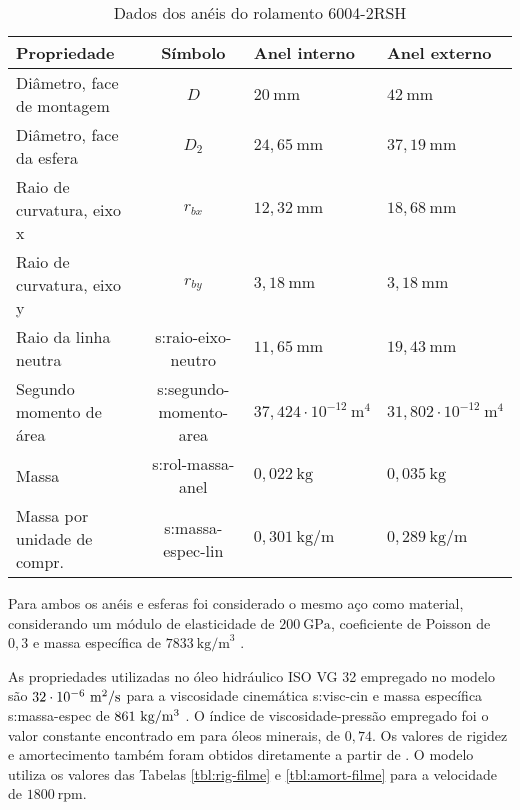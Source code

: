\documentclass[12pt,oneside,english,brazil,lmodern,siglas,simbolos,cite=num]{ucsmonograph}
\begin{document}
	\begin{table}[b]
	\def\arraystretch{1.2}
	\caption{Dados dos anéis do rolamento 6004-2RSH}
	\begin{tabular}{l|c|l|l}
	\toprule
	\textbf{Propriedade} & \textbf{Símbolo} & \textbf{Anel interno} & \textbf{Anel externo} \\\midrule
	Diâmetro, face de montagem & $D$ & $20\ \text{mm}$ & $ 42\ \text{mm}$ \\
	Diâmetro, face da esfera & $D_2$ & $24,65\ \text{mm}$ & $37,19\ \text{mm}$ \\
	Raio de curvatura, eixo x & $r_{bx}$ & $12,32\ \text{mm}$ & $18,68\ \text{mm}$ \\
	Raio de curvatura, eixo y & $r_{by}$ & $3,18\ \text{mm}$ & $3,18\ \text{mm}$ \\
	Raio da linha neutra & \gls{s:raio-eixo-neutro} & $11,65\ \text{mm}$ & $19,43\ \text{mm}$ \\
	Segundo momento de área & \gls{s:segundo-momento-area} & $37,424\cdot 10^{-12}\ \text{m}^4$ & $31,802\cdot 10^{-12}\ \text{m}^4$ \\
	Massa & \gls{s:rol-massa-anel} & $0,022\ \text{kg}$ & $0,035\ \text{kg}$ \\
	Massa por unidade de compr. & \gls{s:massa-espec-lin} & $0,301\ \text{kg/m}$ & $0,289\ \text{kg/m}$ \\\bottomrule
	\end{tabular}
	\label{tbl:6004-aneis}
	\end{table}
	
	Para ambos os anéis e esferas foi considerado o mesmo aço como material, considerando um módulo de elasticidade de $200\ \text{GPa}$, coeficiente de Poisson de $ 0,3 $ e massa específica de $ 7833\ \text{kg/m}^3$ \cite{hamrock:1991}.
	
	As propriedades utilizadas no óleo hidráulico ISO VG 32 empregado no modelo são $32\cdot 10^{-6}\ \text{m\textsuperscript{2}/s}$ para a viscosidade cinemática \gls{s:visc-cin} e massa específica \gls{s:massa-espec} de $861\ \text{kg/m\textsuperscript{3}}$ \cite{iso-vg32}.
	O índice de viscosidade-pressão empregado foi o valor constante encontrado em \cite{roelands:1966} para óleos minerais, de $0,74$.
	Os valores de rigidez e amortecimento também foram obtidos diretamente a partir de \cite{nonato:2014}.
	O modelo utiliza os valores das Tabelas \ref{tbl:rig-filme} e \ref{tbl:amort-filme} para a velocidade de $1800\ \text{rpm}$.

	\begin{figure}[t]
		\label{fig:3d-rolamento}
	\end{figure}
\end{document}

